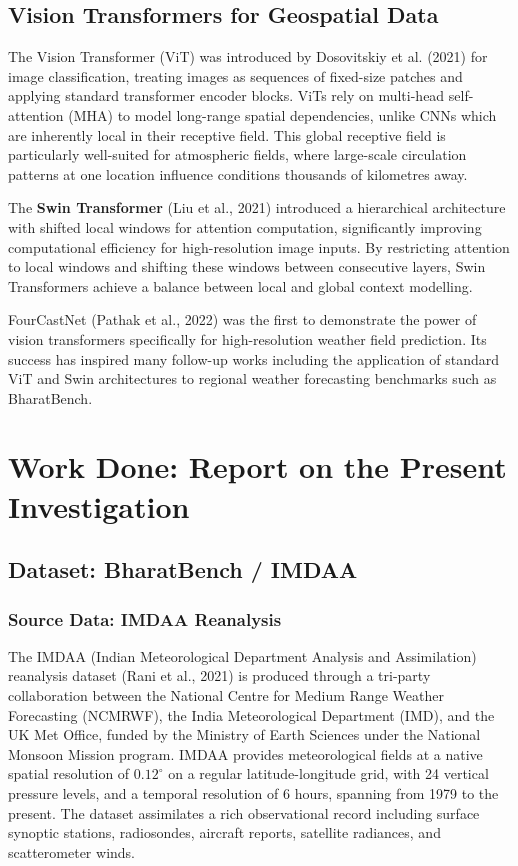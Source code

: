 \documentclass[12pt,a4paper,oneside]{report}
\begin{document}
\section{Vision Transformers for Geospatial Data}

The Vision Transformer (ViT) was introduced by Dosovitskiy et al. (2021) for image classification, treating images as sequences of fixed-size patches and applying standard transformer encoder blocks. ViTs rely on multi-head self-attention (MHA) to model long-range spatial dependencies, unlike CNNs which are inherently local in their receptive field. This global receptive field is particularly well-suited for atmospheric fields, where large-scale circulation patterns at one location influence conditions thousands of kilometres away.

The \textbf{Swin Transformer} (Liu et al., 2021) introduced a hierarchical architecture with shifted local windows for attention computation, significantly improving computational efficiency for high-resolution image inputs. By restricting attention to local windows and shifting these windows between consecutive layers, Swin Transformers achieve a balance between local and global context modelling.

FourCastNet (Pathak et al., 2022) was the first to demonstrate the power of vision transformers specifically for high-resolution weather field prediction. Its success has inspired many follow-up works including the application of standard ViT and Swin architectures to regional weather forecasting benchmarks such as BharatBench.

\chapter{Work Done: Report on the Present Investigation}

\section{Dataset: BharatBench / IMDAA}

\subsection{Source Data: IMDAA Reanalysis}

The IMDAA (Indian Meteorological Department Analysis and Assimilation) reanalysis dataset (Rani et al., 2021) is produced through a tri-party collaboration between the National Centre for Medium Range Weather Forecasting (NCMRWF), the India Meteorological Department (IMD), and the UK Met Office, funded by the Ministry of Earth Sciences under the National Monsoon Mission program. IMDAA provides meteorological fields at a native spatial resolution of $0.12^\circ$ on a regular latitude-longitude grid, with 24 vertical pressure levels, and a temporal resolution of 6 hours, spanning from 1979 to the present. The dataset assimilates a rich observational record including surface synoptic stations, radiosondes, aircraft reports, satellite radiances, and scatterometer winds.
\end{document}
